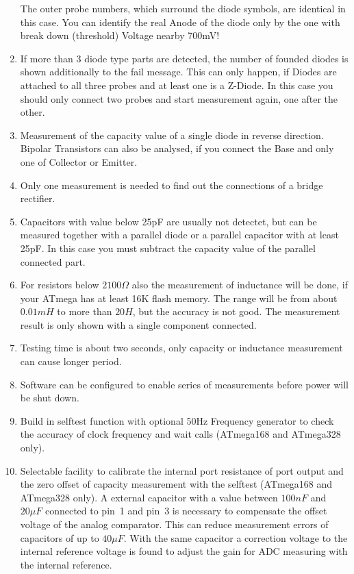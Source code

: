 \begin{enumerate}
The outer probe numbers, which surround the diode symbols, are identical in this case.
You can identify the real Anode of the diode only by the one with break down (threshold) Voltage nearby 700mV!
\item If more than 3 diode type parts are detected, the number of founded diodes is shown additionally to the fail message.
 This can only happen, if Diodes are attached to all three probes and at least one is a Z-Diode.
In this case you should only connect two probes and start measurement again, one after the other.
\item Measurement of the capacity value of a single diode in reverse direction.
Bipolar Transistors can also be analysed, if you connect the Base and only one of Collector or Emitter.
\item Only one measurement is needed to find out the connections of a bridge rectifier.
\item Capacitors with value below 25pF are usually not detectet, but can be measured together with
a parallel diode or a parallel capacitor with at least 25pF.
In this case you must subtract the capacity value of the parallel connected part.
\item For resistors below \(2100 \Omega\) also the measurement of inductance will be done, if
your ATmega has at least 16K flash memory.
The range will be from about \(0.01 mH\) to more than \(20 H\), but the accuracy is not good.
The measurement result is only shown with a single component connected.
\item Testing time is about two seconds, only capacity or inductance measurement can cause longer period.
\item Software can be configured to enable series of measurements before power will be shut down.
\item Build in selftest function with optional 50Hz Frequency generator to check the accuracy of clock frequency and wait calls (ATmega168 and ATmega328 only).
\item Selectable facility to calibrate the internal port resistance of port output and
the zero offset of capacity measurement with the selftest (ATmega168 and ATmega328 only).
A external capacitor with a value between \(100 nF\) 
and \(20 \mu F\) connected to pin~1 and pin~3 is necessary to compensate the offset voltage of the analog comparator.
This can reduce measurement errors of capacitors of up to \(40 \mu F\).
With the same capacitor a correction voltage to the internal reference voltage is found to adjust the
gain for ADC measuring with the internal reference.

\end{enumerate}
